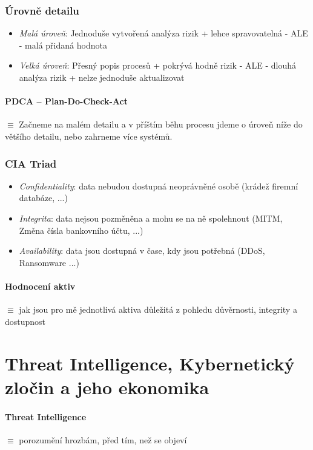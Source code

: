 \documentclass[10pt,a4paper]{article}
\begin{document}
\subsubsection*{Úrovně detailu}
\begin{itemize}
    \item \textit{Malá úroveň}: Jednoduše vytvořená analýza rizik + lehce spravovatelná - ALE - malá přidaná hodnota
    \item \textit{Velká úroveň}: Přesný popis procesů + pokrývá hodně rizik - ALE - dlouhá analýza rizik + nelze jednoduše aktualizovat
\end{itemize}


\paragraph*{PDCA – Plan-Do-Check-Act} $\equiv$ Začneme na malém detailu a v příštím běhu procesu jdeme o úroveň níže do většího detailu, nebo zahrneme více systémů.

\subsubsection*{CIA Triad}
\begin{itemize}
    \item \textit{Confidentiality}: data nebudou dostupná neoprávněné osobě (krádež firemní databáze, ...)
    \item \textit{Integrita}: data nejsou pozměněna a mohu se na ně spolehnout (MITM,  Změna čísla bankovního účtu, ...)
    \item \textit{Availability}: data jsou dostupná v čase, kdy jsou potřebná (DDoS, Ransomware ...)
\end{itemize}

\paragraph*{Hodnocení aktiv} $\equiv$ jak jsou pro mě jednotlivá aktiva důležitá z pohledu důvěrnosti, integrity a dostupnost


\section{Threat Intelligence, Kybernetický zločin a jeho ekonomika}

\paragraph*{Threat Intelligence} $\equiv$ porozumění hrozbám, před tím, než se objeví 
\end{document}
